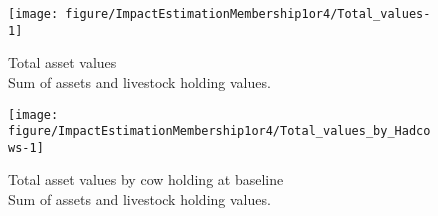 \begin{Schunk}
\begin{figure}

{\centering \texttt{[image: figure/ImpactEstimationMembership1or4/Total\_values-1]} 

}

\caption{Total asset values\\ {\footnotesize Sum of assets and livestock holding values.\setlength{\baselineskip}{8pt}}}\label{Figure Total values}
\end{figure}
\end{Schunk}
\begin{Schunk}
\begin{figure}

{\centering \texttt{[image: figure/ImpactEstimationMembership1or4/Total\_values\_by\_Hadcows-1]} 

}

\caption{Total asset values by cow holding at baseline\\ {\footnotesize Sum of assets and livestock holding values.\setlength{\baselineskip}{8pt}}}\label{Figure Total values by Hadcows}
\end{figure}
\end{Schunk}


